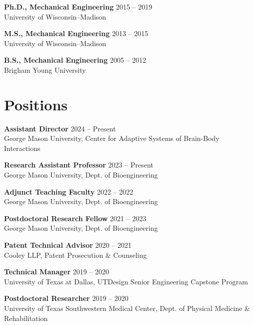 \documentclass[letterpaper, 10pt]{article}
\begin{document}
\textbf{Ph.D., Mechanical Engineering}
\hfill 2015 -- 2019\\ %
University of Wisconsin–Madison %
\medskip

\textbf{M.S., Mechanical Engineering}
\hfill 2013 -- 2015\\ %
University of Wisconsin–Madison %
\medskip

\textbf{B.S., Mechanical Engineering}
\hfill 2005 -- 2012\\ %
Brigham Young University %

\section{Positions}

\textbf{Assistant Director}
\hfill 2024 -- Present\\ %
George Mason University, Center for Adaptive Systems of Brain-Body Interactions
\medskip

\textbf{Research Assistant Professor}
\hfill 2023 -- Present\\ %
George Mason University, Dept. of Bioengineering
\medskip

\textbf{Adjunct Teaching Faculty}
\hfill 2022 -- 2022\\ %
George Mason University, Dept. of Bioengineering
\medskip

\textbf{Postdoctoral Research Fellow}
\hfill 2021 -- 2023\\ %
George Mason University, Dept. of Bioengineering
\medskip

\textbf{Patent Technical Advisor}
\hfill 2020 -- 2021\\ %
Cooley LLP, Patent Prosecution \& Counseling %
\medskip

\textbf{Technical Manager}
\hfill 2019 -- 2020\\ %
University of Texas at Dallas, UTDesign Senior Engineering Capstone Program %
\medskip

\textbf{Postdoctoral Researcher}
\hfill 2019 -- 2020\\ %
University of Texas Southwestern Medical Center, Dept. of Physical Medicine \& Rehabilitation %
\medskip
\end{document}

